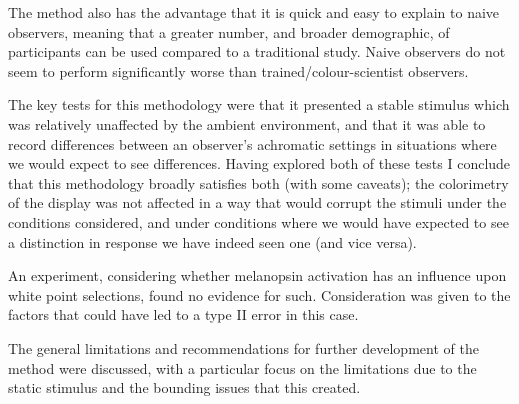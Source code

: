 The method also has the advantage that it is quick and easy to explain to naive observers, meaning that a greater number, and broader demographic, of participants can be used compared to a traditional study. Naive observers do not seem to perform significantly worse than trained/colour-scientist observers.

The key tests for this methodology were that it presented a stable stimulus which was relatively unaffected by the ambient environment, and that it was able to record differences between an observer's achromatic settings in situations where we would expect to see differences. Having explored both of these tests I conclude that this methodology broadly satisfies both (with some caveats); the colorimetry of the display was not affected in a way that would corrupt the stimuli under the conditions considered, and under conditions where we would have expected to see a distinction in response we have indeed seen one (and vice versa).

An experiment, considering whether melanopsin activation has an influence upon white point selections, found no evidence for such. Consideration was given to the factors that could have led to a type II error in this case.

The general limitations and recommendations for further development of the method were discussed, with a particular focus on the limitations due to the static stimulus and the bounding issues that this created.



